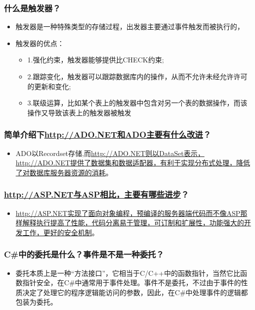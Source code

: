 \documentclass[9pt, b5paper]{article}
\begin{document}
\subsubsection{什么是触发器？}
\label{sec-1-2-99}
\begin{itemize}
\item 触发器是一种特殊类型的存储过程，出发器主要通过事件触发而被执行的，
\item 触发器的优点：
\begin{itemize}
\item 1.强化约束，触发器能够提供比CHECK约束;
\item 2.跟踪变化，触发器可以跟踪数据库内的操作，从而不允许未经允许许可的更新和变化;
\item 3.联级运算，比如某个表上的触发器中包含对另一个表的数据操作，而该操作又导致该表上的触发器被触发
\end{itemize}
\end{itemize}
\subsubsection{简单介绍下\url{http://ADO.NET和ADO主要有什么改进}？}
\label{sec-1-2-100}
\begin{itemize}
\item ADO以Recordset存储,而\url{http://ADO.NET则以DataSet表示，http://ADO.NET提供了数据集和数据适配器，有利于实现分布式处理，降低了对数据库服务器资源的消耗}。
\end{itemize}
\subsubsection{\url{http://ASP.NET与ASP相比，主要有哪些进步}？}
\label{sec-1-2-101}
\begin{itemize}
\item \url{http://ASP.NET实现了面向对象编程，预编译的服务器端代码而不像ASP那样解释执行提高了性能，代码分离易于管理，可订制和扩展性，功能强大的开发工作，更好的安全机制}。
\end{itemize}
\subsubsection{C\#中的委托是什么？事件是不是一种委托？}
\label{sec-1-2-102}
\begin{itemize}
\item 委托本质上是一种“方法接口”，它相当于C/C++中的函数指针，当然它比函数指针安全，在C\#中通常用于事件处理。事件不是委托，不过由于事件的性质决定了处理它的程序逻辑能访问的参数，因此，在C\#中处理事件的逻辑都包装为委托。
\end{itemize}
\end{document}
